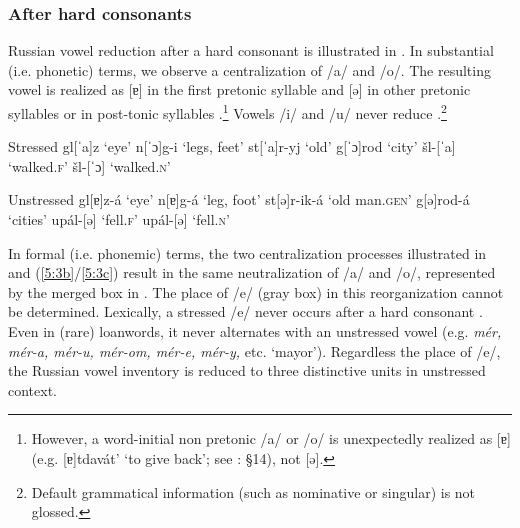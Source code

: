 \documentclass[output=paper,modfonts,newtxmath,hidelinks,]{langscibook}
\begin{document}
\subsubsection{After hard consonants}\label{5:s2.1.1}

Russian vowel reduction after a hard consonant is illustrated in . In substantial (i.e. phonetic) terms, we observe a centralization of /a/ and /o/. The resulting vowel is realized as [ɐ] in the first pretonic syllable  and [ə] in other pretonic syllables  or in post-tonic syllables .\footnote{However, a word-initial non pretonic /a/ or /o/ is unexpectedly realized as [ɐ] (e.g. [ɐ]tdavát’ ‘to give back’; see \citealt{Avanesov1968}: §14), not [ə].} Vowels /i/ and /u/ never reduce \citep[38--42]{Avanesov1968}.\footnote{Default grammatical information (such as nominative or singular) is not glossed.}\vspace{-\baselineskip}

\ea\label{5:3}\begin{multicols}{2}
\begin{xlist}
\exi{} {Stressed}
\ex gl[ˈa]z \tabto{2.1cm}‘eye’\label{5:3a}
\exi{} n[ˈɔ]g-i \tabto{2.1cm}‘legs, feet’
\ex st[ˈa]r-yj \tabto{2.1cm}‘old’\label{5:3b}
\exi{} g[ˈɔ]rod \tabto{2.1cm}‘city’
\ex šl-[ˈa] \tabto{2.1cm}‘walked.\textsc{f}’\label{5:3c}
\exi{} šl-[ˈɔ] \tabto{2.1cm}‘walked.\textsc{n}’
\end{xlist}\columnbreak
\begin{xlist}
\exi{} {Unstressed}
\exi{} gl[ɐ]z-á \tabto{2.1cm}‘eye’
\exi{} n[ɐ]g-á \tabto{2.1cm}‘leg, foot’
\exi{} st[ə]r-ik-á \tabto{2.1cm}‘old man.\textsc{gen}’
\exi{} g[ə]rod-á \tabto{2.1cm}‘cities’
\exi{} upál-[ə] \tabto{2.1cm}‘fell.\textsc{f}’ 
\exi{} upál-[ə] \tabto{2.1cm}‘fell.\textsc{n}’
\end{xlist}
\end{multicols}
\z

In formal (i.e. phonemic) terms, the two centralization processes illustrated in  and (\ref{5:3b}/\ref{5:3c}) result in the same neutralization of /a/ and /o/, represented by the merged box in . The place of /e/ (gray box) in this reorganization cannot be determined. Lexically, a stressed /e/ never occurs after a hard consonant \citep[§103]{Garde1998}. Even in (rare) loanwords, it never alternates with an unstressed vowel (e.g. \textit{mér, mér-a, mér-u, mér-om, mér-e, mér-y,} etc. ‘mayor’). Regardless the place of /e/, the Russian vowel inventory is reduced to three distinctive units in unstressed context.\largerpage[-2]
\end{document}
